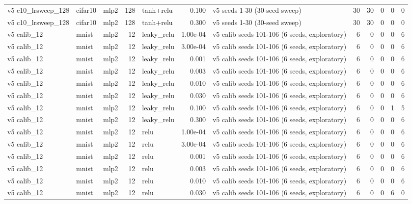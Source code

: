 \begin{table}[htbp]
{\begin{tabular}{@{}lllrlrlrrrrr@{}}
v5 c10\_lrsweep\_128 & cifar10 & mlp2 & 128 & tanh+relu & 0.100 & v5 seeds 1-30 (30-seed sweep) & 30 & 30 & 0 & 0 & 0 \\
v5 c10\_lrsweep\_128 & cifar10 & mlp2 & 128 & tanh+relu & 0.300 & v5 seeds 1-30 (30-seed sweep) & 30 & 30 & 0 & 0 & 0 \\
v5 calib\_12 & mnist & mlp2 & 12 & leaky\_relu & 1.00e-04 & v5 calib seeds 101-106 (6 seeds, exploratory) & 6 & 0 & 0 & 0 & 6 \\
v5 calib\_12 & mnist & mlp2 & 12 & leaky\_relu & 3.00e-04 & v5 calib seeds 101-106 (6 seeds, exploratory) & 6 & 0 & 0 & 0 & 6 \\
v5 calib\_12 & mnist & mlp2 & 12 & leaky\_relu & 0.001 & v5 calib seeds 101-106 (6 seeds, exploratory) & 6 & 0 & 0 & 0 & 6 \\
v5 calib\_12 & mnist & mlp2 & 12 & leaky\_relu & 0.003 & v5 calib seeds 101-106 (6 seeds, exploratory) & 6 & 0 & 0 & 0 & 6 \\
v5 calib\_12 & mnist & mlp2 & 12 & leaky\_relu & 0.010 & v5 calib seeds 101-106 (6 seeds, exploratory) & 6 & 0 & 0 & 0 & 6 \\
v5 calib\_12 & mnist & mlp2 & 12 & leaky\_relu & 0.030 & v5 calib seeds 101-106 (6 seeds, exploratory) & 6 & 0 & 0 & 0 & 6 \\
v5 calib\_12 & mnist & mlp2 & 12 & leaky\_relu & 0.100 & v5 calib seeds 101-106 (6 seeds, exploratory) & 6 & 0 & 0 & 1 & 5 \\
v5 calib\_12 & mnist & mlp2 & 12 & leaky\_relu & 0.300 & v5 calib seeds 101-106 (6 seeds, exploratory) & 6 & 0 & 0 & 0 & 6 \\
v5 calib\_12 & mnist & mlp2 & 12 & relu & 1.00e-04 & v5 calib seeds 101-106 (6 seeds, exploratory) & 6 & 0 & 0 & 0 & 6 \\
v5 calib\_12 & mnist & mlp2 & 12 & relu & 3.00e-04 & v5 calib seeds 101-106 (6 seeds, exploratory) & 6 & 0 & 0 & 0 & 6 \\
v5 calib\_12 & mnist & mlp2 & 12 & relu & 0.001 & v5 calib seeds 101-106 (6 seeds, exploratory) & 6 & 0 & 0 & 0 & 6 \\
v5 calib\_12 & mnist & mlp2 & 12 & relu & 0.003 & v5 calib seeds 101-106 (6 seeds, exploratory) & 6 & 0 & 0 & 0 & 6 \\
v5 calib\_12 & mnist & mlp2 & 12 & relu & 0.010 & v5 calib seeds 101-106 (6 seeds, exploratory) & 6 & 0 & 0 & 0 & 6 \\
v5 calib\_12 & mnist & mlp2 & 12 & relu & 0.030 & v5 calib seeds 101-106 (6 seeds, exploratory) & 6 & 0 & 0 & 6 & 0 \\

\end{tabular}}
\end{table}
